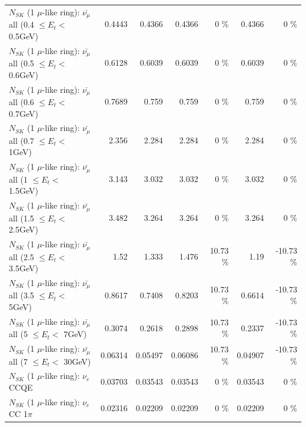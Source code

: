 \begin{table}
\begin{tabular}{| l | r | r | r  r | r  r |}
 $N_{SK}$ (1 $\mu$-like ring): $\bar{\nu_{\mu}}$ all (0.4 $\leq E_{t} <$ 0.5GeV) &          0.4443 &          0.4366 &          0.4366 &        0 \%  &          0.4366 &        0 \%  \\ 
 $N_{SK}$ (1 $\mu$-like ring): $\bar{\nu_{\mu}}$ all (0.5 $\leq E_{t} <$ 0.6GeV) &          0.6128 &          0.6039 &          0.6039 &        0 \%  &          0.6039 &        0 \%  \\ 
 $N_{SK}$ (1 $\mu$-like ring): $\bar{\nu_{\mu}}$ all (0.6 $\leq E_{t} <$ 0.7GeV) &          0.7689 &           0.759 &           0.759 &        0 \%  &           0.759 &        0 \%  \\ 
   $N_{SK}$ (1 $\mu$-like ring): $\bar{\nu_{\mu}}$ all (0.7 $\leq E_{t} <$ 1GeV) &           2.356 &           2.284 &           2.284 &        0 \%  &           2.284 &        0 \%  \\ 
   $N_{SK}$ (1 $\mu$-like ring): $\bar{\nu_{\mu}}$ all (1 $\leq E_{t} <$ 1.5GeV) &           3.143 &           3.032 &           3.032 &        0 \%  &           3.032 &        0 \%  \\ 
 $N_{SK}$ (1 $\mu$-like ring): $\bar{\nu_{\mu}}$ all (1.5 $\leq E_{t} <$ 2.5GeV) &           3.482 &           3.264 &           3.264 &        0 \%  &           3.264 &        0 \%  \\ 
 $N_{SK}$ (1 $\mu$-like ring): $\bar{\nu_{\mu}}$ all (2.5 $\leq E_{t} <$ 3.5GeV) &            1.52 &           1.333 &           1.476 &    10.73 \%  &            1.19 &   -10.73 \%  \\ 
   $N_{SK}$ (1 $\mu$-like ring): $\bar{\nu_{\mu}}$ all (3.5 $\leq E_{t} <$ 5GeV) &          0.8617 &          0.7408 &          0.8203 &    10.73 \%  &          0.6614 &   -10.73 \%  \\ 
     $N_{SK}$ (1 $\mu$-like ring): $\bar{\nu_{\mu}}$ all (5 $\leq E_{t} <$ 7GeV) &          0.3074 &          0.2618 &          0.2898 &    10.73 \%  &          0.2337 &   -10.73 \%  \\ 
    $N_{SK}$ (1 $\mu$-like ring): $\bar{\nu_{\mu}}$ all (7 $\leq E_{t} <$ 30GeV) &         0.06314 &         0.05497 &         0.06086 &    10.73 \%  &         0.04907 &   -10.73 \%  \\ 
\hline
\hline
\hline
                                      $N_{SK}$ (1 $\mu$-like ring): $\nu_e$ CCQE &         0.03703 &         0.03543 &         0.03543 &        0 \%  &         0.03543 &        0 \%  \\ 
                                 $N_{SK}$ (1 $\mu$-like ring): $\nu_e$ CC 1$\pi$ &         0.02316 &         0.02209 &         0.02209 &        0 \%  &         0.02209 &        0 \%  \\ 

\end{tabular}
\end{table}
